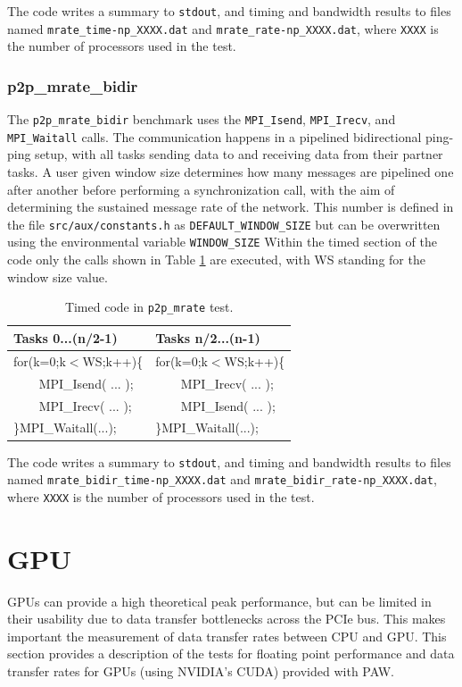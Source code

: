 \documentclass[10pt,a4paper]{report}
\begin{document}
The code writes a summary to \verb+stdout+, and timing and bandwidth results to files named \verb+mrate_time-np_XXXX.dat+ and \verb+mrate_rate-np_XXXX.dat+, where \verb+XXXX+ is the number of processors used in the test.

\FloatBarrier

\subsection{p2p\_mrate\_bidir}
The \verb+p2p_mrate_bidir+ benchmark uses the \verb+MPI_Isend+, \verb+MPI_Irecv+, and \verb+MPI_Waitall+ calls. The communication happens in a pipelined bidirectional ping-ping setup, with all tasks sending data to and receiving data from their partner tasks. A user given window size determines how many messages are pipelined one after another before performing a synchronization call, with the aim of determining the sustained message rate of the network. This number is defined in the file \verb+src/aux/constants.h+ as \verb+DEFAULT_WINDOW_SIZE+ but can be overwritten using the environmental variable \verb+WINDOW_SIZE+  Within the timed section of the code only the calls shown in Table \ref{tab:mrate_bdr} are executed, with WS standing for the window size value.

\begin{table}[ht]
\centering
\caption{Timed code in \texttt{p2p\_mrate} test.}
\label{tab:mrate_bdr}
\begin{tabular}{|l|l|}
\hline
\bf{Tasks 0...(n/2-1)}	      & \bf{Tasks n/2...(n-1)}\\\hline
for(k=0;k$<$WS;k++)\{          & for(k=0;k$<$WS;k++)\{ \\
\verb+    +MPI\_Isend( ... );  & \verb+    +MPI\_Irecv( ... );\\
\verb+    +MPI\_Irecv( ... );  & \verb+    +MPI\_Isend( ... );\\
\}MPI\_Waitall(...);    & \}MPI\_Waitall(...);\\\hline
\end{tabular}
\end{table}

The code writes a summary to \verb+stdout+, and timing and bandwidth results to files named \verb+mrate_bidir_time-np_XXXX.dat+ and \verb+mrate_bidir_rate-np_XXXX.dat+, where \verb+XXXX+ is the number of processors used in the test.

\FloatBarrier
\chapter{GPU}
GPUs can provide a high theoretical peak performance, but can be limited in their usability due to data transfer bottlenecks across the PCIe bus. This makes important the measurement of data transfer rates between CPU and GPU. This section provides a description of the tests for floating point performance and data transfer rates for GPUs (using NVIDIA's CUDA) provided with PAW.
\end{document}
